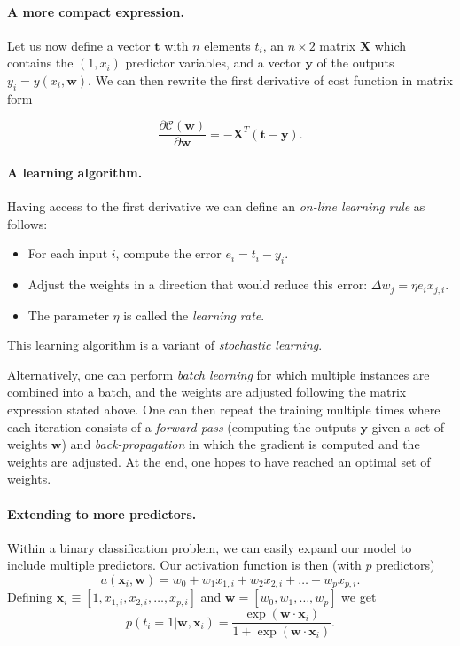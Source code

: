 \documentclass[%
oneside,                 %
final,                   %
10pt]{article}
\newenvironment{notice_mdfboxadmon}[1][]{
\begin{notice_mdfboxmdframed}[frametitle=#1]
}
{
\end{notice_mdfboxmdframed}
}
\begin{document}
\paragraph{A more compact expression.}
Let us now define a vector $\boldsymbol{t}$ with $n$ elements $t_i$, an
$n\times 2$ matrix $\boldsymbol{X}$ which contains the $(1, x_i)$ predictor variables, and a
vector $\boldsymbol{y}$ of the outputs $y_i = y(x_i,\boldsymbol{w})$. We can then rewrite the first
derivative of cost function in matrix form

\[
\frac{\partial \mathcal{C}(\boldsymbol{w})}{\partial \boldsymbol{w}} = -\boldsymbol{X}^T\left( \boldsymbol{t}-\boldsymbol{y} \right). 
\]

\paragraph{A learning algorithm.}

\begin{notice_mdfboxadmon}[Notice]
Having access to the first derivative we can define an \emph{on-line learning rule} as follows:
\begin{itemize}
\item For each input $i$, compute the error $e_i = t_i - y_i$.

\item Adjust the weights in a direction that would reduce this error: $\Delta w_j = \eta e_i x_{j,i}$.

\item The parameter $\eta$ is called the \emph{learning rate}.
\end{itemize}

\noindent
This learning algorithm is a variant of \emph{stochastic learning}.
\end{notice_mdfboxadmon} %



Alternatively, one can perform \emph{batch learning} for which multiple instances are combined into a batch, and the weights are adjusted following the matrix expression stated above. One can then repeat the training multiple times where each iteration consists of a \emph{forward pass} (computing the outputs $\boldsymbol{y}$ given a set of weights $\boldsymbol{w}$) and \emph{back-propagation} in which the gradient is computed and the weights are adjusted. At the end, one hopes to have reached an optimal set of weights.

\paragraph{Extending to more predictors.}
Within a binary classification problem, we can easily expand our model to include multiple predictors. Our activation function is then (with $p$ predictors)
\[
a( \boldsymbol{x}_i, \boldsymbol{w} ) = w_0 + w_1 x_{1,i} + w_2 x_{2,i} + \dots + w_p x_{p,i}.
\]
Defining $\boldsymbol{x}_i \equiv [1,x_{1,i}, x_{2,i}, \dots, x_{p,i}]$ and $\boldsymbol{w}=[w_0, w_1, \dots, w_p]$ we get
\[
p(t_i=1 | \boldsymbol{w}, \boldsymbol{x}_i) = \frac{ \exp{ \left( \boldsymbol{w} \cdot \boldsymbol{x}_i \right) }}{ 1 + \exp{ \left( \boldsymbol{w} \cdot \boldsymbol{x}_i \right) } }.
\]
\end{document}
